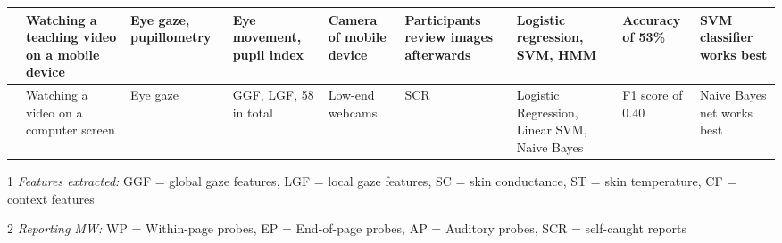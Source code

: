 \begin{xtabular}{p{25mm}p{30mm}p{30mm}p{22mm}p{38mm}p{22mm}p{33mm}p{22mm}p{35mm}}
\cite{ISI:000443429900018} & Watching a teaching video on a mobile device & Eye gaze, pupillometry & Eye movement, pupil index & Camera of mobile device & Participants review images afterwards & Logistic regression, SVM, HMM & Accuracy of 53\% & SVM classifier works best\\ \midrule
\cite{Zhao2017ScalableApproach} & Watching a video on a computer screen & Eye gaze & GGF, LGF, 58 in total & Low-end webcams & SCR & Logistic Regression, Linear SVM, Naive Bayes & F1 score of 0.40 & Naive Bayes net works best\\ \midrule
\bottomrule
\end{xtabular}
\begin{ThreePartTable}
        \begin{tablenotes}
        \small
        \item[1] \emph{Features extracted:} GGF = global gaze features, LGF = local gaze features, SC = skin conductance, ST = skin temperature, CF = context features
        \item[2] \emph{Reporting MW:} WP = Within-page probes, EP = End-of-page probes, AP = Auditory probes, SCR = self-caught reports
        \end{tablenotes}
\end{ThreePartTable}
\restoregeometry %
\twocolumn       %